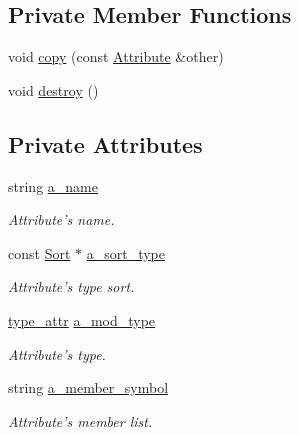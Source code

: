 \subsection*{Private Member Functions}
\begin{CompactItemize}
\item 
void \hyperlink{classgenevalmag_1_1Attribute_55686b1777729123c1cd8ad1e813ea53}{copy} (const \hyperlink{classgenevalmag_1_1Attribute}{Attribute} \&other)
\item 
void \hyperlink{classgenevalmag_1_1Attribute_bdc7b01e147fd9b112f8d786a9e5f027}{destroy} ()
\end{CompactItemize}
\subsection*{Private Attributes}
\begin{CompactItemize}
\item 
string \hyperlink{classgenevalmag_1_1Attribute_bae18584e82c30495a4ecb959f46921b}{a\_\-name}
\begin{CompactList}\small\item\em Attribute's name. \item\end{CompactList}\item 
const \hyperlink{classgenevalmag_1_1Sort}{Sort} $\ast$ \hyperlink{classgenevalmag_1_1Attribute_869f6c4c44a1e1513059a7dd26e56266}{a\_\-sort\_\-type}
\begin{CompactList}\small\item\em Attribute's type sort. \item\end{CompactList}\item 
\hyperlink{namespacegenevalmag_0ae71e3da3851df63075a93820da40af}{type\_\-attr} \hyperlink{classgenevalmag_1_1Attribute_cd49e385c2137cf59f4ab5eec1a5b4d3}{a\_\-mod\_\-type}
\begin{CompactList}\small\item\em Attribute's type. \item\end{CompactList}\item 
string \hyperlink{classgenevalmag_1_1Attribute_c7e7d8421dcb4aa5678dee2133ec0a9b}{a\_\-member\_\-symbol}
\begin{CompactList}\small\item\em Attribute's member list. \item\end{CompactList}\end{CompactItemize}



